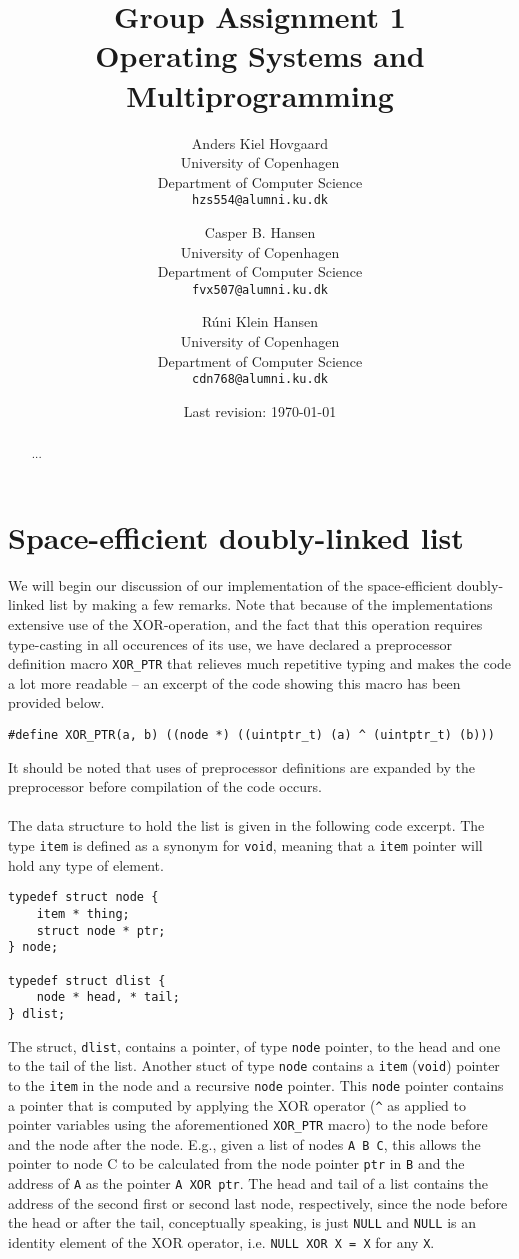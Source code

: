 \documentclass[11pt]{article}
\title
{
    {\Large Group Assignment 1} \\
    Operating Systems and Multiprogramming
}
\author
{
    Anders Kiel Hovgaard \\
    University of Copenhagen \\
    Department of Computer Science \\
    {\tt hzs554@alumni.ku.dk}
    \and
    Casper B. Hansen \\
    University of Copenhagen \\
    Department of Computer Science \\
    {\tt fvx507@alumni.ku.dk}
    \and
    Rúni Klein Hansen \\
    University of Copenhagen \\
    Department of Computer Science \\
    {\tt cdn768@alumni.ku.dk}
}
\date{Last revision: \today}
\newcommand{\code}[1]{{\tt #1}}
\begin{document}
\clearpage
\maketitle
\thispagestyle{empty}
\begin{multicols}{2}
    \begin{abstract}
    ...
    \end{abstract}
    \vfill\columnbreak
    \tableofcontents\vfill
\end{multicols}
\newpage

\section{Space-efficient doubly-linked list}
We will begin our discussion of our implementation of the space-efficient
doubly-linked list by making a few remarks. Note that because of the
implementations extensive use of the XOR-operation, and the fact that this
operation requires type-casting in all occurences of its use, we have declared
a preprocessor definition macro \code{XOR\_PTR} that relieves much repetitive
typing and makes the code a lot more readable -- an excerpt of the code
showing this macro has been provided below.

\begin{lstlisting}
#define XOR_PTR(a, b) ((node *) ((uintptr_t) (a) ^ (uintptr_t) (b)))
\end{lstlisting}

It should be noted that uses of preprocessor definitions are expanded by the
preprocessor before compilation of the code occurs.\\
\\
The data structure to hold the list is given in the following code excerpt. The
type \code{item} is defined as a synonym for \code{void}, meaning that a
\code{item} pointer will hold any type of element.
\begin{lstlisting}
typedef struct node {
    item * thing;
    struct node * ptr;
} node;

typedef struct dlist {
    node * head, * tail;
} dlist;
\end{lstlisting}
The struct, \code{dlist}, contains a pointer, of type \code{node} pointer, to
the head and one to the tail of the list. Another stuct of type \code{node}
contains a \code{item} (\code{void}) pointer to the \code{item} in the node and
a recursive \code{node} pointer. This \code{node} pointer contains a pointer
that is computed by applying the XOR operator (\lstinline{^} as applied to
pointer variables using the aforementioned \lstinline{XOR_PTR} macro) to the
node before and the node after the node. E.g., given a list of nodes
\verb|A B C|, this allows the pointer to node C to be calculated from the node
pointer \code{ptr} in \verb|B| and the address of \verb|A| as the pointer
\code{A XOR ptr}. The head and tail of a list contains the address of the second
first or second last node, respectively, since the node before the head or after
the tail, conceptually speaking, is just \code{NULL} and \code{NULL} is an
identity element of the XOR operator, i.e. \code{NULL XOR X = X} for any
\code{X}.
\end{document}
